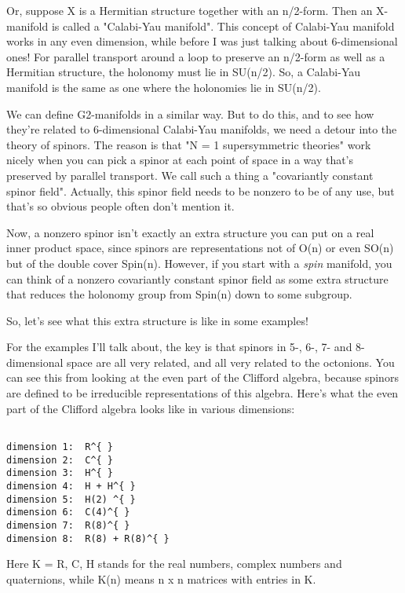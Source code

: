 Or, suppose X is a Hermitian structure together with an n/2-form.
Then an X-manifold is called a "Calabi-Yau manifold".  This concept 
of Calabi-Yau manifold works in any even dimension, while before I was 
just talking about 6-dimensional ones!  For parallel transport around 
a loop to preserve an n/2-form as well as a Hermitian structure, 
the holonomy must lie in SU(n/2).  So, a Calabi-Yau manifold is the 
same as one where the holonomies lie in SU(n/2).  

We can define G2-manifolds in a similar way.  But to do this, and
to see how they're related to 6-dimensional Calabi-Yau manifolds,
we need a detour into the theory of spinors.  The reason is that 
"N = 1 supersymmetric theories" work nicely when you can pick a
spinor at each point of space in a way that's preserved by parallel 
transport.  We call such a thing a "covariantly constant spinor 
field".  Actually, this spinor field needs to be nonzero to be
of any use, but that's so obvious people often don't mention it.

Now, a nonzero spinor isn't exactly an extra structure you can put 
on a real inner product space, since spinors are representations
not of O(n) or even SO(n) but of the double cover Spin(n).  
However, if you start with a \emph{spin} manifold, you can think of a
nonzero covariantly constant spinor field as some extra structure
that reduces the holonomy group from Spin(n) down to some subgroup.

So, let's see what this extra structure is like in some examples!

For the examples I'll talk about, the key is that spinors in 5-, 6-, 7- 
and 8-dimensional space are all very related, and all very related to 
the octonions.  You can see this from looking at the even part of 
the Clifford algebra, because spinors are defined to be irreducible
representations of this algebra.  Here's what the even part of the 
Clifford algebra looks like in various dimensions:


\begin{verbatim}

dimension 1:  R^{ }
dimension 2:  C^{ }
dimension 3:  H^{ }
dimension 4:  H + H^{ }
dimension 5:  H(2) ^{ }
dimension 6:  C(4)^{ }
dimension 7:  R(8)^{ }
dimension 8:  R(8) + R(8)^{ }
\end{verbatim}
    
Here K = R, C, H stands for the real numbers, complex numbers and 
quaternions, while K(n) means n x n matrices with entries in K. 

